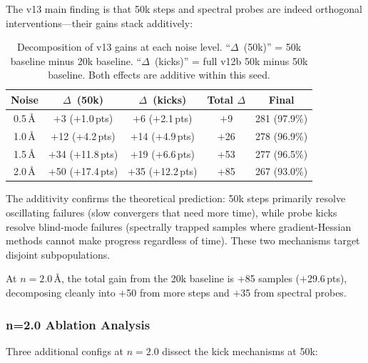\documentclass[11pt,a4paper]{article}
\theoremstyle{definition}
\begin{document}
The v13 main finding is that 50k steps and spectral probes are indeed
orthogonal interventions---their gains stack additively:

\begin{table}[h]
\centering
\caption{Decomposition of v13 gains at each noise level.
  ``$\Delta$~(50k)'' = 50k baseline minus 20k baseline.
  ``$\Delta$~(kicks)'' = full v12b 50k minus 50k baseline.
  Both effects are additive within this seed.}
\label{tab:v13-orthogonality}
\begin{tabular}{ccccc}
\toprule
Noise & $\Delta$~(50k) & $\Delta$~(kicks) & Total $\Delta$ & Final \\
\midrule
0.5\,\AA & $+$3 ($+$1.0\,pts) & $+$6 ($+$2.1\,pts) & $+$9 & 281 (97.9\%) \\
1.0\,\AA & $+$12 ($+$4.2\,pts) & $+$14 ($+$4.9\,pts) & $+$26 & 278 (96.9\%) \\
1.5\,\AA & $+$34 ($+$11.8\,pts) & $+$19 ($+$6.6\,pts) & $+$53 & 277 (96.5\%) \\
2.0\,\AA & $+$50 ($+$17.4\,pts) & $+$35 ($+$12.2\,pts) & $+$85 & 267 (93.0\%) \\
\bottomrule
\end{tabular}
\end{table}

The additivity confirms the theoretical prediction: 50k steps primarily
resolve oscillating failures (slow convergers that need more time), while
probe kicks resolve blind-mode failures (spectrally trapped samples
where gradient-Hessian methods cannot make progress regardless of time).
These two mechanisms target disjoint subpopulations.

At $n=2.0$\,\AA, the total gain from the 20k baseline is $+$85 samples
($+$29.6\,pts), decomposing cleanly into $+$50 from more steps and $+$35
from spectral probes.

\subsubsection{n=2.0 Ablation Analysis}
\label{sec:v13-ablation}

Three additional configs at $n=2.0$ dissect the kick mechanisms at 50k:
\end{document}
